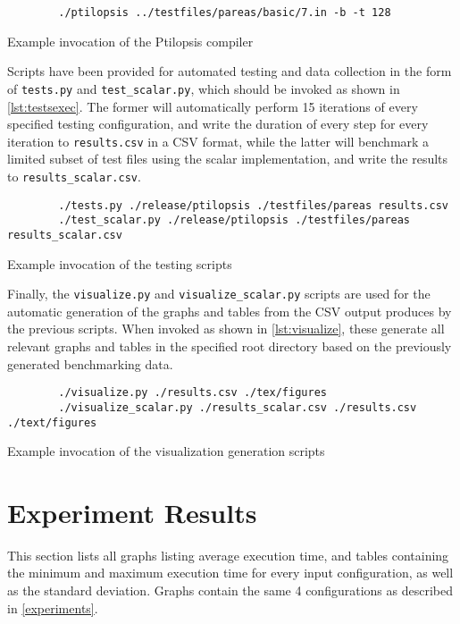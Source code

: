 \documentclass[11pt,dvipsnames]{article}
\newcommand{\mono}[1]{\texttt{#1}}
\begin{document}
\begin{listing}[h]
    \begin{verbatim}
        ./ptilopsis ../testfiles/pareas/basic/7.in -b -t 128
    \end{verbatim}
    \caption{Example invocation of the Ptilopsis compiler}
    \label{lst:examplerun}
\end{listing}

Scripts have been provided for automated testing and data collection in the form of \mono{tests.py} and \mono{test\_scalar.py}, which should be invoked as shown in \autoref{lst:testsexec}. The former will automatically perform 15 iterations of every specified testing configuration, and write the duration of every step for every iteration to \mono{results.csv} in a CSV format, while the latter will benchmark a limited subset of test files using the scalar implementation, and write the results to \mono{results\_scalar.csv}.

\begin{listing}[ht]
    \begin{verbatim}
        ./tests.py ./release/ptilopsis ./testfiles/pareas results.csv
        ./test_scalar.py ./release/ptilopsis ./testfiles/pareas results_scalar.csv
    \end{verbatim}
    \caption{Example invocation of the testing scripts}
    \label{lst:testsexec}
\end{listing}

Finally, the \mono{visualize.py} and \mono{visualize\_scalar.py} scripts are used for the automatic generation of the graphs and tables from the CSV output produces by the previous scripts. When invoked as shown in \autoref{lst:visualize}, these generate all relevant graphs and tables in the specified root directory based on the previously generated benchmarking data.

\begin{listing}[ht]
   \begin{verbatim}
        ./visualize.py ./results.csv ./tex/figures
        ./visualize_scalar.py ./results_scalar.csv ./results.csv ./text/figures
   \end{verbatim}
   \caption{Example invocation of the visualization generation scripts}
   \label{lst:visualize}
\end{listing}

\section{Experiment Results} \label{results}
This section lists all graphs listing average execution time, and tables containing the minimum and maximum execution time for every input configuration, as well as the standard deviation. Graphs contain the same 4 configurations as described in \autoref{experiments}.
\end{document}
